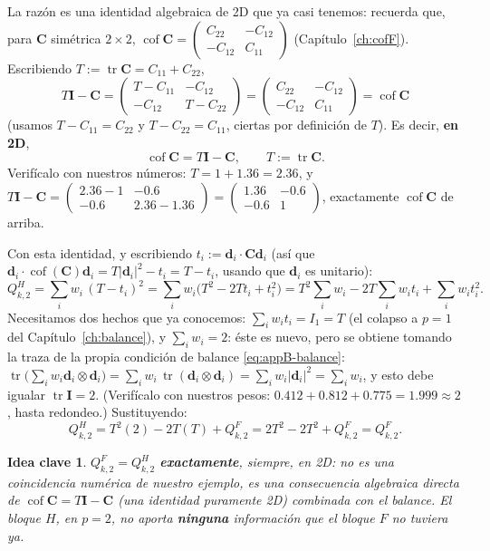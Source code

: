 \documentclass[11pt,a4paper]{article}
\newtheorem{takeaway}{Idea clave}
\newcommand{\Cof}{\operatorname{cof}}
\newcommand{\tr}{\operatorname{tr}}
\begin{document}
La raz\'on es una identidad algebraica de 2D que ya casi tenemos:
recuerda que, para $\bm C$ sim\'etrica $2\times2$,
$\Cof\bm C=\begin{pmatrix}C_{22}&-C_{12}\\-C_{12}&C_{11}\end{pmatrix}$
(Cap\'itulo~\ref{ch:cofF}). Escribiendo $T:=\tr\bm C=C_{11}+C_{22}$,
\[
 T\bm I-\bm C=\begin{pmatrix}T-C_{11}&-C_{12}\\-C_{12}&T-C_{22}\end{pmatrix}
 =\begin{pmatrix}C_{22}&-C_{12}\\-C_{12}&C_{11}\end{pmatrix}=\Cof\bm C
\]
(usamos $T-C_{11}=C_{22}$ y $T-C_{22}=C_{11}$, ciertas por definici\'on
de $T$). Es decir, \textbf{en 2D},
\begin{equation}
 \Cof\bm C=T\bm I-\bm C, \qquad T:=\tr\bm C.
 \label{eq:appB-cofC-identity}
\end{equation}
Verif\'icalo con nuestros n\'umeros: $T=1+1.36=2.36$, y
$T\bm I-\bm C=\begin{pmatrix}2.36-1&-0.6\\-0.6&2.36-1.36\end{pmatrix}
 =\begin{pmatrix}1.36&-0.6\\-0.6&1\end{pmatrix}$, exactamente
$\Cof\bm C$ de arriba.

Con esta identidad, y escribiendo $t_i:=\bm d_i\cdot\bm C\bm d_i$ (as\'i
que $\bm d_i\cdot\Cof(\bm C)\bm d_i=T|\bm d_i|^2-t_i=T-t_i$, usando que
$\bm d_i$ es unitario):
\[
 Q_{k,2}^H=\sum_i w_i\,(T-t_i)^2
 =\sum_i w_i\big(T^2-2Tt_i+t_i^2\big)
 =T^2\sum_i w_i-2T\sum_i w_i t_i+\sum_i w_i t_i^2.
\]
Necesitamos dos hechos que ya conocemos: $\sum_i w_i t_i=I_1=T$ (el
colapso a $p=1$ del Cap\'itulo~\ref{ch:balance}), y
$\sum_i w_i=2$: \'este es nuevo, pero se obtiene tomando la traza de
la propia condici\'on de balance \eqref{eq:appB-balance}:
$\tr\big(\sum_i w_i\bm d_i\otimes\bm d_i\big)=\sum_i w_i\,\tr(\bm d_i\otimes\bm d_i)
=\sum_i w_i|\bm d_i|^2=\sum_i w_i$, y esto debe igualar $\tr\bm I=2$.
(Verif\'icalo con nuestros pesos: $0.412+0.812+0.775=1.999\approx2$,
hasta redondeo.) Sustituyendo:
\[
 Q_{k,2}^H=T^2(2)-2T(T)+Q_{k,2}^F=2T^2-2T^2+Q_{k,2}^F=Q_{k,2}^F.
\]
\begin{takeaway}
$Q_{k,2}^F=Q_{k,2}^H$ \textbf{exactamente}, siempre, en 2D: no es
una coincidencia num\'erica de nuestro ejemplo, es una consecuencia
algebraica directa de $\Cof\bm C=T\bm I-\bm C$ (una identidad
puramente 2D) combinada con el balance. El bloque $H$, en $p=2$, no
aporta \textbf{ninguna} informaci\'on que el bloque $F$ no tuviera ya.
\end{takeaway}
\end{document}
